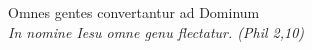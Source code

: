 


\def\greinitialformat#1{%
{\fontsize{39}{39}\selectfont #1}%
}




\vspace{0.3cm}
\begin{center}
 
Omnes gentes convertantur ad Dominum\\
\textit{\small In nomine Iesu omne genu flectatur. (Phil 2,10)}
\end{center}
